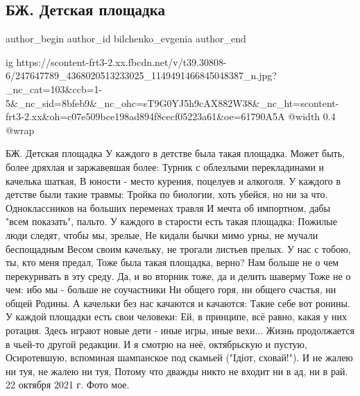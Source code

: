  
 
 
 
 
 
\subsection{БЖ. Детская площадка}
\label{sec:22_10_2021.fb.bilchenko_evgenia.1.detstaja_ploschadka}
 
\ifcmt
 author_begin
   author_id bilchenko_evgenia
 author_end
\fi

\ifcmt
  ig https://scontent-frt3-2.xx.fbcdn.net/v/t39.30808-6/247647789_4368020513233025_1149491466845048387_n.jpg?_nc_cat=103&ccb=1-5&_nc_sid=8bfeb9&_nc_ohc=sT9G0YJ5h9cAX882W38&_nc_ht=scontent-frt3-2.xx&oh=c07e509bce198ad894f8cecf05223a61&oe=61790A5A
  @width 0.4
  @wrap 
\fi

БЖ. Детская площадка
У каждого в детстве была такая площадка.
Может быть, более дряхлая и заржавевшая более:
Турник с облезлыми перекладинами и качелька шаткая,
В юности - место курения, поцелуев и алкоголя.
У каждого в детстве были такие травмы:
Тройка по биологии, хоть убейся, но ни за что.
Одноклассников на больших переменах травля
И мечта об импортном, дабы "всем показать", пальто.
У каждого в старости есть такая площадка:
Пожилые люди следят, чтобы мы, зрелые,
Не кидали бычки мимо урны, не мучали беспощадным
Весом своим качельку, не трогали листьев прелых.
У нас с тобою, ты, кто меня предал,
Тоже была такая площадка, верно?
Нам больше не о чем перекуривать в эту среду.
Да, и во вторник тоже, да и делить шаверму
Тоже не о чем: ибо мы - больше не соучастники
Ни общего горя, ни общего счастья, ни общей Родины.
А качельки без нас качаются и качаются:
Такие себе вот ронины.
У каждой площадки есть свои человеки:
Ей, в принципе, всё равно, какая у них ротация.
Здесь играют новые дети - иные игры, иные вехи...
Жизнь продолжается в чьей-то другой редакции.
И я смотрю на неё, октябрьскую и пустую,
Осиротевшую, вспоминая шампанское под скамьей ("Ідіот, сховай!").
И не жалею ни туя, не жалею ни туя,
Потому что дважды никто не входит ни в ад, ни в рай.
22 октября 2021 г.
Фото мое.

